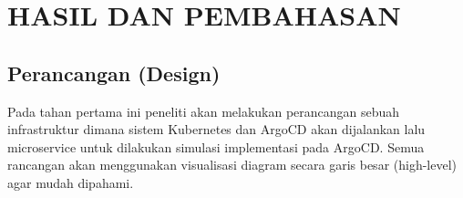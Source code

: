 \renewcommand{\chaptername}{BAB}
\chapter{HASIL DAN PEMBAHASAN}
\vspace{4.5pt}
\setlength{\parskip}{0.5em}
\section{Perancangan (Design)}\label{sec:bab4_perancangan}
Pada tahan pertama ini peneliti akan melakukan perancangan sebuah infrastruktur
dimana sistem Kubernetes dan ArgoCD akan dijalankan lalu microservice untuk
dilakukan simulasi implementasi pada ArgoCD. Semua rancangan akan menggunakan
visualisasi diagram secara garis besar (high-level) agar mudah dipahami.

